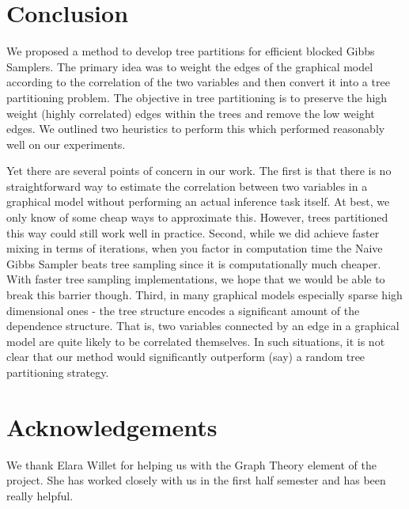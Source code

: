 \documentclass{article} %
\begin{document}
\section{Conclusion}

We proposed a method to develop tree partitions for efficient blocked Gibbs
Samplers. The primary idea was to weight the edges of the graphical model
according to the correlation of the two variables and then convert it into a
tree partitioning problem. The objective in tree partitioning is to preserve the
high weight (highly correlated) edges within the trees and remove the low
weight edges. We outlined two heuristics to perform this which performed
reasonably well on our experiments.

Yet there are several points of concern in our work. The first is that there
is no straightforward way to estimate the correlation between two variables in a
graphical model without performing an actual inference task itself. At best, we
only know of some cheap ways to approximate this. However, trees partitioned
this way could still work well in practice. Second, while we did achieve faster
mixing in terms of iterations, when you factor in computation time the Naive
Gibbs Sampler beats tree sampling since it is computationally much cheaper. With
faster tree sampling implementations, we hope that we would be able to break
this barrier though.
Third, in many graphical models
especially sparse high dimensional ones - the tree structure encodes a
significant amount of the dependence structure. That is, two variables connected
by an edge in a graphical model are quite likely to be correlated themselves. In
such situations, it is not clear that our method would significantly outperform
(say) a random tree partitioning strategy.

\section*{Acknowledgements}
\label{sec:acknowledgement}
We thank Elara Willet for helping us with the Graph Theory element of
the project. She has worked closely with us in the first half
semester and has been really helpful.

 
     
\end{document}

